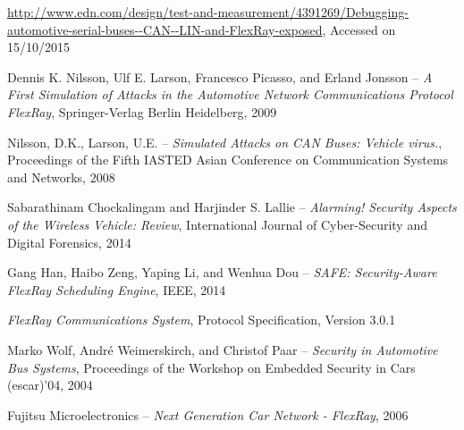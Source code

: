 \documentclass{latex4ei/latex4ei_report}		%
\begin{document}
\begin{thebibliography}{1}

    \url{http://www.edn.com/design/test-and-measurement/4391269/Debugging-automotive-serial-buses--CAN--LIN-and-FlexRay-exposed}, Accessed on 15/10/2015


    Dennis K. Nilsson, Ulf E. Larson, Francesco Picasso, and Erland Jonsson -- \emph{A First Simulation of Attacks in the Automotive Network Communications Protocol FlexRay}, Springer-Verlag Berlin Heidelberg, 2009

    Nilsson, D.K., Larson, U.E. -- \emph{Simulated Attacks on CAN Buses: Vehicle virus.}, Proceedings of the Fifth IASTED Asian Conference on Communication Systems and Networks, 2008


    Sabarathinam Chockalingam and Harjinder S. Lallie -- \emph{Alarming! Security Aspects of the Wireless Vehicle: Review}, International Journal of Cyber-Security and Digital Forensics, 2014

    Gang Han, Haibo Zeng, Yaping Li, and Wenhua Dou -- \emph{SAFE: Security-Aware FlexRay Scheduling Engine}, IEEE, 2014

    \emph{FlexRay Communications System}, Protocol Specification, Version 3.0.1

    Marko Wolf, André Weimerskirch, and Christof Paar -- \emph{Security in Automotive Bus Systems}, Proceedings of the Workshop on Embedded Security in Cars (escar)’04, 2004

    Fujitsu Microelectronics – \emph{Next Generation Car Network - FlexRay}, 2006

\end{thebibliography}
\end{document}
